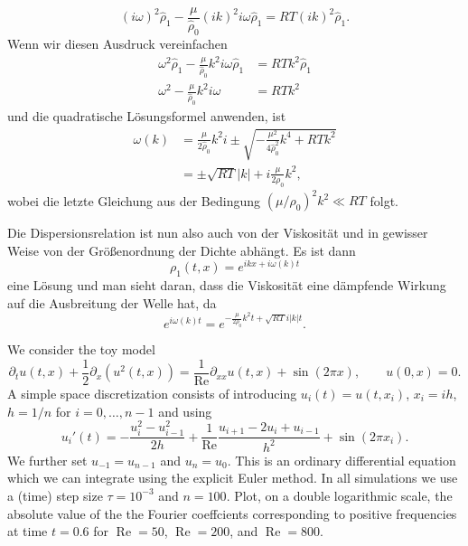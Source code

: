 \documentclass[12pt]{exam}
\newcommand{\del}{\partial}
\begin{document}
\begin{questions}
\begin{solution}
\begin{equation*}
            (i \omega)^2 \hat{\rho}_1 - \frac{\mu}{\hat{\rho}_0}(i k)^2 i \omega \hat{\rho}_1=RT (i k)^2 \hat{\rho}_1.
        \end{equation*}
        Wenn wir diesen Ausdruck vereinfachen
        \begin{align*}
            \omega^2 \hat{\rho}_1 - \frac{\mu}{\hat{\rho}_0} k^2 i \omega \hat{\rho}_1 &= RT k^2 \hat{\rho}_1 \\
            \omega^2 - \frac{\mu}{\hat{\rho}_0} k^2 i\omega &= RT k^2 
        \end{align*}
        und die quadratische Lösungsformel anwenden, ist
        \begin{align*}
            \omega(k) &= \frac{\mu}{2 \hat{\rho}_0} k^2 i \pm \sqrt{- \frac{\mu^2}{4 \hat{\rho}_0^2} k^4 + RT k^2} \\
            &= \pm \sqrt{RT} |k| + i \frac{\mu}{2 \rho_0} k^2,
        \end{align*}
        wobei die letzte Gleichung aus der Bedingung $(\mu / \rho_0)^2 k^2 \ll RT$ folgt.
        
        Die Dispersionsrelation ist nun also auch von der Viskosität und in gewisser Weise von der Größenordnung der Dichte abhängt. Es ist dann
        \begin{equation*}
            \rho_1 (t, x) = e^{i k x + i \omega(k) t}
        \end{equation*}
        eine Lösung und man sieht daran, dass die Viskosität eine dämpfende Wirkung auf die Ausbreitung der Welle hat, da
        \begin{equation*}
            e^{i \omega(k) t} = e^{-\frac{\mu}{2 \rho_0} k^2 t + \sqrt{RT} i |k| t}.
        \end{equation*}
    \end{solution}
    
    
    \question We consider the toy model
    \begin{equation*}
        \del_t u(t,x) + \frac{1}{2} \del_x(u^2(t,x)) = \frac{1}{\text{Re}} \del_{xx} u(t,x) + \sin(2 \pi x), \qquad u(0,x) = 0.
    \end{equation*}
    A simple space discretization consists of introducing $u_i(t) = u(t, x_i)$, $x_i = ih$, $h = 1/n$ for $i = 0, \ldots, n - 1$ and using
    \begin{equation*}
        u_i'(t) = - \frac{u_i^2 - u_{i-1}^2}{2h} + \frac{1}{\text{Re}} \frac{u_{i+1} - 2u_i + u_{i-1}}{h^2} + \sin(2 \pi x_i).
    \end{equation*}
    We further set $u_{-1} = u_{n-1}$ and $u_n = u_0$. This is an ordinary differential equation which we can integrate using the explicit Euler method. In all simulations we use a (time) step size $\tau = 10^{-3}$ and $n = 100$. \newline
    Plot, on a double logarithmic scale, the absolute value of the the Fourier coeffcients corresponding to positive frequencies at time $t = 0.6$ for $\operatorname{Re} = 50$, $\operatorname{Re} = 200$, and $\operatorname{Re} = 800$.
    

\end{questions}
\end{document}

